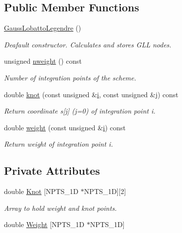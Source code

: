 \subsection*{Public Member Functions}
\begin{DoxyCompactItemize}
\item 
\hyperlink{classoomph_1_1GaussLobattoLegendre_3_012_00_01NPTS__1D_01_4_a0dee3143e486b59326d774682332812f}{Gauss\+Lobatto\+Legendre} ()
\begin{DoxyCompactList}\small\item\em Deafault constructor. Calculates and stores G\+LL nodes. \end{DoxyCompactList}\item 
unsigned \hyperlink{classoomph_1_1GaussLobattoLegendre_3_012_00_01NPTS__1D_01_4_a1d7de3fd70cc8684195a2d7de253eb69}{nweight} () const
\begin{DoxyCompactList}\small\item\em Number of integration points of the scheme. \end{DoxyCompactList}\item 
double \hyperlink{classoomph_1_1GaussLobattoLegendre_3_012_00_01NPTS__1D_01_4_ae3194b6f3d9bf6d0448cf3d055ed57d1}{knot} (const unsigned \&\hyperlink{cfortran_8h_adb50e893b86b3e55e751a42eab3cba82}{i}, const unsigned \&j) const
\begin{DoxyCompactList}\small\item\em Return coordinate s\mbox{[}j\mbox{]} (j=0) of integration point i. \end{DoxyCompactList}\item 
double \hyperlink{classoomph_1_1GaussLobattoLegendre_3_012_00_01NPTS__1D_01_4_a61eb3f22e13ab35f91d9439ec5382ebf}{weight} (const unsigned \&\hyperlink{cfortran_8h_adb50e893b86b3e55e751a42eab3cba82}{i}) const
\begin{DoxyCompactList}\small\item\em Return weight of integration point i. \end{DoxyCompactList}\end{DoxyCompactItemize}
\subsection*{Private Attributes}
\begin{DoxyCompactItemize}
\item 
double \hyperlink{classoomph_1_1GaussLobattoLegendre_3_012_00_01NPTS__1D_01_4_a410881f935a19c9df7de4bd2cfa6aa29}{Knot} \mbox{[}N\+P\+T\+S\+\_\+1D $\ast$N\+P\+T\+S\+\_\+1D\mbox{]}\mbox{[}2\mbox{]}
\begin{DoxyCompactList}\small\item\em Array to hold weight and knot points. \end{DoxyCompactList}\item 
double \hyperlink{classoomph_1_1GaussLobattoLegendre_3_012_00_01NPTS__1D_01_4_a1b5e7aa6863b1a44c51346cdf2d1edc7}{Weight} \mbox{[}N\+P\+T\+S\+\_\+1D $\ast$N\+P\+T\+S\+\_\+1D\mbox{]}
\end{DoxyCompactItemize}
